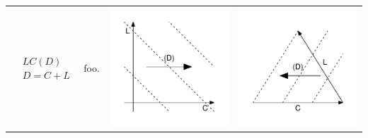 \documentclass[
  12pt
]{scrartcl}
\begin{document}
\begin{center}
\begin{longtable}{m{}m{}m{}m{}}
  \midrule
  $$\begin{aligned}
    &LC(D) \\
    &D = C + L
  \end{aligned}$$ &
  foo. &
  \includegraphics[width = \linewidth]{../fig/LCd.pdf} &
  \includegraphics[width = \linewidth]{../fig/LCd_iso.pdf}  \\

\end{longtable}
\end{center}
\end{document}
